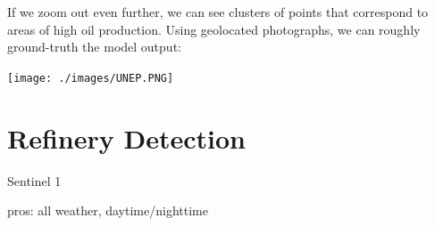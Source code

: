 \documentclass[
  letterpaper,
  DIV=11,
  numbers=noendperiod]{scrreprt}
\begin{document}
If we zoom out even further, we can see clusters of points that
correspond to areas of high oil production. Using geolocated
photographs, we can roughly ground-truth the model output:

\texttt{[image: ./images/UNEP.PNG]}

\hypertarget{refinery-detection-1}{%
\chapter*{Refinery Detection}\label{refinery-detection-1}}


Sentinel 1

pros: all weather, daytime/nighttime
\end{document}
